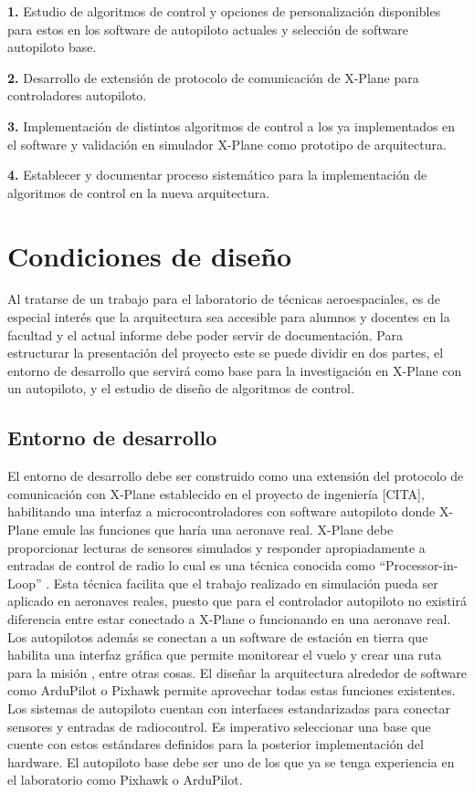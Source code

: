 \textbf{1.} Estudio de algoritmos de control y opciones de personalización disponibles para estos en los software de autopiloto actuales y selección de software autopiloto base.

\textbf{2.} Desarrollo de extensión de protocolo de comunicación de X-Plane para controladores autopiloto.

\textbf{3.} Implementación de distintos algoritmos de control a los ya implementados en el software y validación en simulador X-Plane como prototipo de arquitectura.

\textbf{4.} Establecer y documentar proceso sistemático para la implementación de algoritmos de control en la nueva arquitectura.

\section{Condiciones de diseño}

Al tratarse de un trabajo para el laboratorio de técnicas aeroespaciales, es de especial interés que la arquitectura sea accesible para alumnos y docentes en la facultad y el actual informe debe poder servir de documentación. Para estructurar la presentación del proyecto este se puede dividir en dos partes, el entorno de desarrollo que servirá como base para la investigación en X-Plane con un autopiloto, y el estudio de diseño de algoritmos de control.

\subsection{Entorno de desarrollo}

El entorno de desarrollo debe ser construido como una extensión del protocolo de comunicación con X-Plane establecido en el proyecto de ingeniería [CITA], habilitando una interfaz a microcontroladores con software autopiloto donde X-Plane emule las funciones que haría una aeronave real. X-Plane debe proporcionar lecturas de sensores simulados y responder apropiadamente a entradas de control de radio lo cual es una técnica conocida como ``Processor-in-Loop'' \cite{pil}. Esta técnica facilita que el trabajo realizado en simulación pueda ser aplicado en aeronaves reales, puesto que para el controlador autopiloto no existirá diferencia entre estar conectado a X-Plane o funcionando en una aeronave real. Los autopilotos además se conectan a un software de estación en tierra que habilita una interfaz gráfica que permite monitorear el vuelo y crear una ruta para la misión \cite{ardupilot-gs}, entre otras cosas. El diseñar la arquitectura alrededor de software como ArduPilot o Pixhawk permite aprovechar todas estas funciones existentes. Los sistemas de autopiloto cuentan con interfaces estandarizadas para conectar sensores y entradas de radiocontrol. Es imperativo seleccionar una base que cuente con estos estándares definidos para la posterior implementación del hardware. El autopiloto base debe ser uno de los que ya se tenga experiencia en el laboratorio como Pixhawk o ArduPilot.

